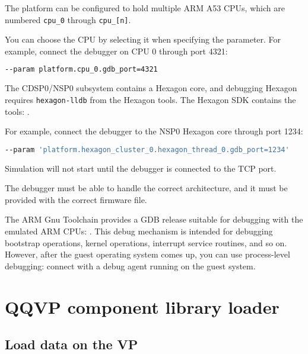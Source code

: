 The platform can be configured to hold multiple ARM A53 CPUs, which are numbered {\small{\lstinline!cpu_0!}} through {\small{\lstinline!cpu_[n]!}}.

You can choose the CPU by selecting it when specifying the parameter. For example, connect the debugger on CPU 0 through port 4321:

\small
\begin{lstlisting}[language=bash]
    --param platform.cpu_0.gdb_port=4321
\end{lstlisting}
\normalsize

The CDSP0/NSP0 subsystem contains a Hexagon core, and debugging Hexagon
requires {\small{\lstinline!hexagon-lldb!}} from the Hexagon tools.  The Hexagon SDK
contains the tools: {}.

For example, connect the debugger to the NSP0 Hexagon core through port 1234:

\small
\begin{lstlisting}[language=bash]
    --param 'platform.hexagon_cluster_0.hexagon_thread_0.gdb_port=1234'
\end{lstlisting}
\normalsize

Simulation will not start until the debugger is connected to the TCP port.

\caution The debugger must be able to handle the correct architecture, and it must be provided with the correct firmware file.

The ARM Gnu Toolchain provides a GDB release suitable for debugging with the emulated ARM CPUs: {}. This debug mechanism is intended for debugging bootstrap operations, kernel operations, interrupt service routines, and so on. However, after the guest operating system comes up, you can use process-level debugging: connect with a debug agent running on the guest system.

\clearpage
\section{QQVP component library loader}

\subsection{Load data on the VP}
\label{sec:load-data-on-vp}

